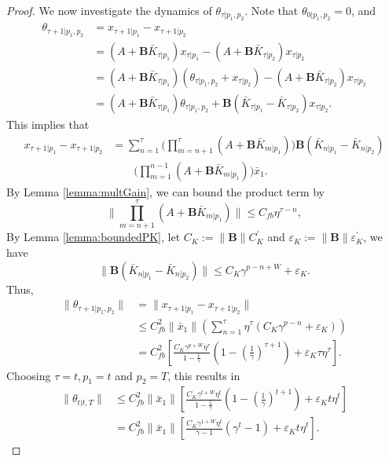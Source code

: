 \documentclass[letterpaper, 10 pt, conference]{ieeeconf}  %
\newcommand{\BK}[1]{\mathbf{B}\bar{K}_{#1}}
\begin{document}
\begin{proof}
We now investigate the dynamics of $\theta_{\tau|p_{1},p_{2}}$. Note that $\theta_{0|p_{1},p_{2}} = 0$, and 
\begin{align*}
    \theta_{\tau+1|p_{1},p_{2}} &= x_{\tau+1|p_{1}} - x_{\tau+1|p_{2}}\\
    &= (A+\BK{\tau|p_{1}})x_{\tau|p_{1}}-(A+\BK{\tau|p_{2}})x_{\tau|p_{2}}\\
    &= (A+\BK{\tau|p_{1}})(\theta_{\tau|p_{1},p_{2}}+x_{\tau|p_{2}})-(A+\BK{\tau|p_{2}})x_{\tau|p_{2}}\\
    &= (A+\BK{\tau|p_{1}})\theta_{\tau|p_{1},p_{2}} + \mathbf{B}(\bar{K}_{\tau|p_{1}}-\bar{K}_{\tau|p_{2}})x_{\tau|p_{2}}.
\end{align*}
This implies that
\begin{align*}
    x_{\tau+1|p_{1}} - x_{\tau+1|p_{2}} &= \sum_{n=1}^{\tau}\bigg(\prod_{m=n+1}^{\tau}(A+\BK{m|p_{1}})\bigg)\mathbf{B}(\bar{K}_{n|p_{1}}-\bar{K}_{n|p_{2}})\\
        &\qquad \bigg(\prod_{m=1}^{n-1}(A+\BK{m|p_{1}})\bigg)\bar{x}_{1}.
\end{align*}
By Lemma \ref{lemma:multGain}, we can bound the product term by
\begin{equation*}
    \| \prod_{m=n+1}^{\tau}(A+\BK{m|p_{1}})\| \leq C_{fb}\eta^{\tau-n},
\end{equation*}
By Lemma \ref{lemma:boundedPK}, let $C_{K} := \|\mathbf{B}\|C_{K}^{'}$ and $\varepsilon_{K} := \|\mathbf{B}\|\varepsilon_{K}^{'}$, we have
\begin{equation*}
    \|\mathbf{B}(\bar{K}_{n|p_{1}}-\bar{K}_{n|p_{2}})\| \leq C_{K}\gamma^{p-n+W}+\varepsilon_{K}.
\end{equation*}
Thus,
\begin{align*}
    \|\theta_{\tau+1|p_{1},p_{2}}\| &= \|x_{\tau+1|p_{1}}-x_{\tau+1|p_{2}}\|\\
    &\leq C_{fb}^{2}\|\bar{x}_{1}\|(\sum_{n=1}^{\tau}\eta^{\tau}(C_{K}\gamma^{p-n}+\varepsilon_{K}))\\
    &= C_{fb}^{2}[\frac{C_{K}\gamma^{p+W}\eta^{\tau}}{1-\frac{1}{\gamma}}(1-(\frac{1}{\gamma})^{\tau+1})+ \varepsilon_{K}\tau\eta^{\tau}].
\end{align*}
Choosing $\tau = t,p_{1} = t$ and $p_{2} = T$, this results in
\begin{align*}
    \|\theta_{t|t,T}\| &\leq C^{2}_{fb}\|\bar{x}_{1}\|[\frac{C_{K}\gamma^{t+W}\eta^{t}}{1-\frac{1}{\gamma}}(1-(\frac{1}{\gamma})^{t+1}) + \varepsilon_{K}t\eta^{t}]\\
    &= C^{2}_{fb}\|\bar{x}_{1}\|[\frac{C_{K}\gamma^{1+W}\eta^{t}}{\gamma-1}(\gamma^{t}-1) + \varepsilon_{K}t\eta^{t}].
\end{align*}


\end{proof}
\end{document}
